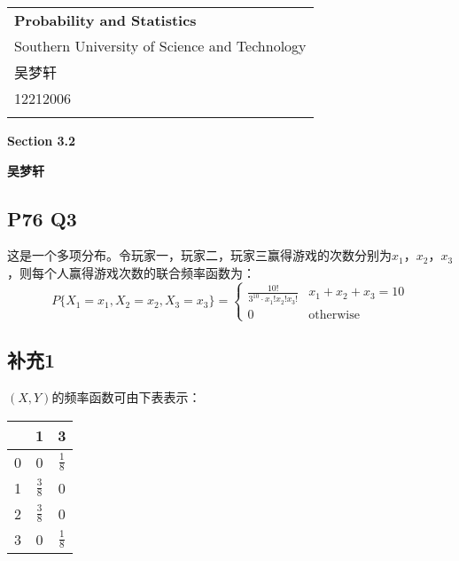 \documentclass[a4paper,12pt]{ctexart}
\begin{document}
\thispagestyle{empty} %

\begin{tabular}{p{15.5cm}}
{\large \bf Probability and Statistics} \\
Southern University of Science and Technology \\ 吴梦轩 \\ 12212006 \\
\hline
\\
\end{tabular}

\vspace*{0.3cm} %

\begin{center}
	{\Large \bf Section 3.2}
	\vspace{2mm}

	{\bf 吴梦轩}
		
\end{center}  

\vspace{0.4cm}

\subsection*{P76 Q3}

这是一个多项分布。令玩家一，玩家二，玩家三赢得游戏的次数分别为$x_1$，$x_2$，$x_3$，则每个人赢得游戏次数的联合频率函数为：
\begin{equation*}
	P\{X_1 = x_1, X_2 = x_2, X_3 = x_3 \} = 
	\begin{cases}
		\frac{10!}{3^{10} \cdot x_1!x_2!x_3!} & x_1+x_2+x_3 = 10 \\
		0 & \text{otherwise}
	\end{cases}
\end{equation*}

\subsection*{补充1}

$(X,Y)$的频率函数可由下表表示：
\begin{center}
	\begin{tabular}{c|cc}
		\diagbox{$X$}{$Y$} & 1 & 3 \\ \hline
		0 & 0 & $\frac{1}{8}$ \\
		1 &	$\frac{3}{8}$ & 0 \\
		2 & $\frac{3}{8}$ & 0 \\
		3 & 0 & $\frac{1}{8}$ 
	\end{tabular}
\end{center}
\end{document}

